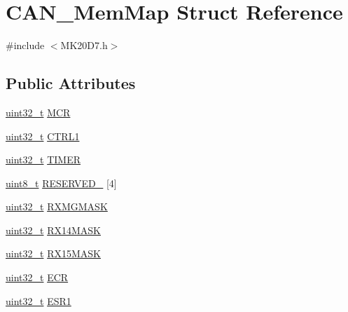 \hypertarget{struct_c_a_n___mem_map}{}\section{C\+A\+N\+\_\+\+Mem\+Map Struct Reference}
\label{struct_c_a_n___mem_map}


{\ttfamily \#include $<$M\+K20\+D7.\+h$>$}

\subsection*{Public Attributes}
\begin{DoxyCompactItemize}
\item 
\hyperlink{_p_e___types_8h_a33594304e786b158f3fb30289278f5af}{uint32\+\_\+t} \hyperlink{struct_c_a_n___mem_map_aa78ee3ab61a8a0a9bceade6152bccec3}{M\+CR}
\item 
\hyperlink{_p_e___types_8h_a33594304e786b158f3fb30289278f5af}{uint32\+\_\+t} \hyperlink{struct_c_a_n___mem_map_aa7e5faeb995f97f465296095ec696576}{C\+T\+R\+L1}
\item 
\hyperlink{_p_e___types_8h_a33594304e786b158f3fb30289278f5af}{uint32\+\_\+t} \hyperlink{struct_c_a_n___mem_map_a7cdd012a6030c4bf528cec65fddb71ca}{T\+I\+M\+ER}
\item 
\hyperlink{_p_e___types_8h_aba7bc1797add20fe3efdf37ced1182c5}{uint8\+\_\+t} \hyperlink{struct_c_a_n___mem_map_ae566ee05319dd0c460e5eb8213234da0}{R\+E\+S\+E\+R\+V\+E\+D\+\_} \mbox{[}4\mbox{]}
\item 
\hyperlink{_p_e___types_8h_a33594304e786b158f3fb30289278f5af}{uint32\+\_\+t} \hyperlink{struct_c_a_n___mem_map_aa788d49d34c42aeb411ed6b43f1a7c42}{R\+X\+M\+G\+M\+A\+SK}
\item 
\hyperlink{_p_e___types_8h_a33594304e786b158f3fb30289278f5af}{uint32\+\_\+t} \hyperlink{struct_c_a_n___mem_map_ad9454220446b5a706a53b100d31c223a}{R\+X14\+M\+A\+SK}
\item 
\hyperlink{_p_e___types_8h_a33594304e786b158f3fb30289278f5af}{uint32\+\_\+t} \hyperlink{struct_c_a_n___mem_map_a4e60a1ec55f8fc14e4cdcd00e922d76d}{R\+X15\+M\+A\+SK}
\item 
\hyperlink{_p_e___types_8h_a33594304e786b158f3fb30289278f5af}{uint32\+\_\+t} \hyperlink{struct_c_a_n___mem_map_ae333e3fdb5adc42d26fa7a9b9c2014f4}{E\+CR}
\item 
\hyperlink{_p_e___types_8h_a33594304e786b158f3fb30289278f5af}{uint32\+\_\+t} \hyperlink{struct_c_a_n___mem_map_a22b3d30edd2510d48809119a334deb5c}{E\+S\+R1}

\end{DoxyCompactItemize}

